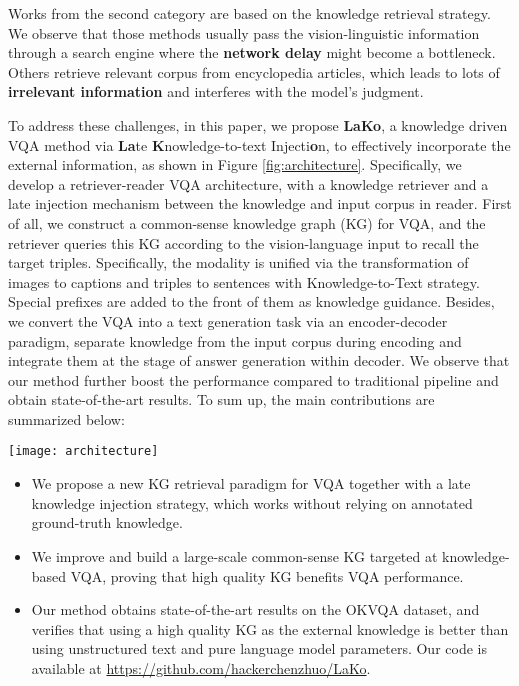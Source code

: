 \documentclass[sigconf]{acmart}
\newcommand{\cjy}[1]{{\color{black}#1}}
\newcommand{\Jeff}[1]{{\color{black}#1}}
\begin{document}
Works from the second category are based on the knowledge retrieval strategy.
We observe that those methods \citep{DBLP:conf/ijcai/ZhuYWS0W20,DBLP:journals/corr/abs-2109-04014,DBLP:conf/sigir/QuZ0CL21,DBLP:conf/sigir/JainKKJRC21} usually pass the vision-linguistic information through a search engine 
where the \textbf{network delay} might become a bottleneck. 
Others retrieve relevant corpus from encyclopedia articles, which leads to lots of \textbf{irrelevant information} and interferes with the model's judgment.


To address these challenges, in this paper, we propose \textbf{LaKo}, a knowledge driven VQA method via \textbf{La}te \textbf{K}nowledge-to-text Injecti\textbf{o}n, to effectively incorporate the external information, as shown in \cjy{Figure} \ref{fig:architecture}.
Specifically, we develop a \Jeff{retriever-reader VQA architecture, with} \cjy{a} knowledge retriever and a late injection mechanism between the knowledge and input corpus in reader.
First of all, 
we construct a common-sense knowledge graph (KG) for VQA, and 
the retriever queries this KG according to the vision-language input to recall the target triples. 
Specifically, the modality is unified  via the transformation of images to captions and triples to sentences with  Knowledge-to-Text strategy. Special prefixes are added to the front of them as knowledge guidance. 
Besides, we convert the VQA into a text generation task via an encoder-decoder paradigm, separate knowledge from the input corpus during encoding and integrate them at the stage of answer generation within decoder.
We observe that our method further boost the performance compared to traditional pipeline and obtain state-of-the-art results. 
To sum up, the main contributions are summarized below:
\begin{figure*}[htbp]
\texttt{[image: architecture]}
    \caption{The overview model architecture of LaKo. Given a ($v,q$) pair, the generated background text and knowledge text retrieved by vision-language KG retriever are separately send to reader  for late knowledge injection. The predicted $ans$ tokens are decoded in turn.} 
  \label{fig:architecture}
  \vspace{-1mm}
\end{figure*}
\begin{itemize}
    \item We propose a new KG retrieval paradigm \Jeff{for} VQA together with a late knowledge injection strategy, which \Jeff{works without relying} on annotated ground-truth knowledge.
    \item We improve and build a large-scale common-sense KG targeted at knowledge-based VQA, proving that high quality KG benefits VQA performance.
    \item Our method obtains state-of-the-art results on \cjy{the} OKVQA dataset, 
\cjy{and verifies that using a high quality KG as the external knowledge is better than using unstructured text and pure language model parameters}. 
    Our code is available at \url{https://github.com/hackerchenzhuo/LaKo}.
\end{itemize}
\end{document}
